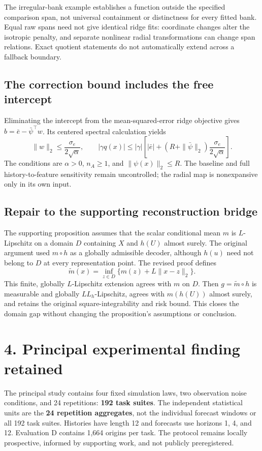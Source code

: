 \documentclass[11pt]{article}
\begin{document}
The irregular-bank example establishes a function outside the specified
comparison span, not universal containment or distinctness for every
fitted bank. Equal raw spans need not give identical ridge fits:
coordinate changes alter the isotropic penalty, and separate nonlinear
radial transformations can change span relations. Exact quotient
statements do not automatically extend across a fallback boundary.

\subsection*{The correction bound includes the free intercept}
Eliminating the intercept from the mean-squared-error ridge objective
gives $b=\bar e-\bar\psi^\top w$. Its centered spectral calculation yields
\[
 \|w\|_2\leq\frac{\sigma_e}{2\sqrt\alpha},\qquad
 |\gamma q(x)|\leq|\gamma|\left[
 |\bar e|+(R+\|\bar\psi\|_2)\frac{\sigma_e}{2\sqrt\alpha}\right].
\]
The conditions are $\alpha>0$, $n_A\geq1$, and $\|\psi(x)\|_2\leq R$.
The baseline and full history-to-feature sensitivity remain uncontrolled;
the radial map is nonexpansive only in its own input.

\subsection*{Repair to the supporting reconstruction bridge}
The supporting proposition assumes that the scalar conditional mean $m$
is $L$-Lipschitz on a domain $D$ containing $X$ and $h(U)$ almost surely.
The original argument used $m\circ h$ as a globally admissible decoder,
although $h(u)$ need not belong to $D$ at every representation point.
The revised proof defines
\[
 \widetilde m(x)=\inf_{z\in D}\{m(z)+L\|x-z\|_2\}.
\]
This finite, globally $L$-Lipschitz extension agrees with $m$ on $D$.
Then $g=\widetilde m\circ h$ is measurable and globally
$LL_h$-Lipschitz, agrees with $m(h(U))$ almost surely, and retains the
original square-integrability and risk bound. This closes the domain
gap without changing the proposition's assumptions or conclusion.

\newpage
\section*{4. Principal experimental finding retained}

The principal study contains four fixed simulation laws, two observation
noise conditions, and 24 repetitions: \textbf{192 task suites}. The
independent statistical units are the \textbf{24 repetition aggregates},
not the individual forecast windows or all 192 task suites. Histories
have length 12 and forecasts use horizons 1, 4, and 12. Evaluation D
contains 1,664 origins per task. The protocol remains locally prospective,
informed by supporting work, and not publicly preregistered.
\end{document}
